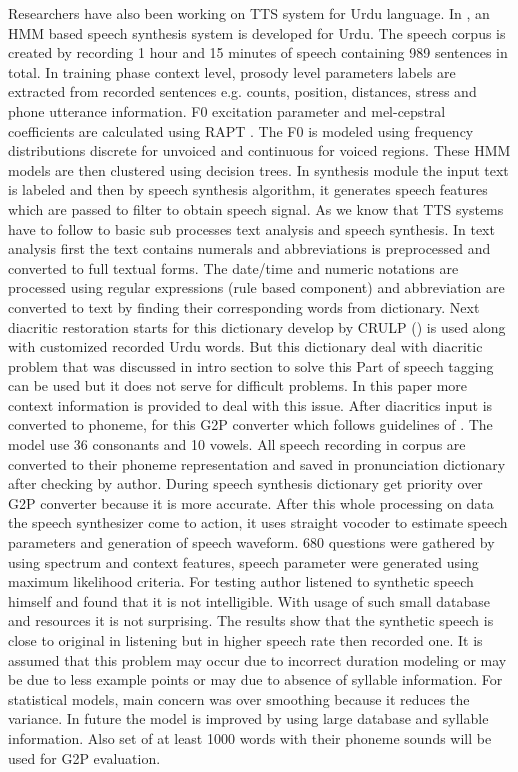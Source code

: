 Researchers have also been working on TTS system for Urdu language. In \cite{ahmed2014hmm}, an HMM based speech synthesis system is developed for Urdu. The speech corpus is created by recording 1 hour and 15 minutes of speech containing 989 sentences in total. In training phase context level, prosody level parameters labels are extracted from recorded sentences e.g. counts, position, distances, stress and phone utterance information. F0 excitation parameter and mel-cepstral coefficients are calculated using RAPT \cite{kleijn1995speech}. The F0 is modeled using frequency
distributions discrete for unvoiced and continuous for voiced regions. These HMM models are then clustered using decision
trees. In synthesis module the input text is labeled and then by speech synthesis algorithm, it generates speech features which
are passed to filter to obtain speech signal. As we know that TTS systems have to follow to basic sub processes text analysis
and speech synthesis. In text analysis first the text contains numerals and abbreviations is preprocessed and converted to full
textual forms. The date/time and numeric notations are processed using regular expressions (rule based component) and
abbreviation are converted to text by finding their corresponding words from dictionary. Next diacritic restoration starts for
this dictionary develop by CRULP (\cite{crulp}) is used along with customized recorded Urdu words. But this dictionary
deal with diacritic problem that was discussed in intro section to solve this Part of speech tagging can be used but it does not
serve for difficult problems. In this paper more context information is provided to deal with this issue. After diacritics input is
converted to phoneme, for this G2P converter which follows guidelines of \cite{hussain2004sound}. The model use 36
consonants and 10 vowels. All speech recording in corpus are converted to their phoneme representation and saved in
pronunciation dictionary after checking by author. During speech synthesis dictionary get priority over G2P converter
because it is more accurate. After this whole processing on data the speech synthesizer come to action, it uses straight
vocoder to estimate speech parameters and generation of speech waveform. 680 questions were gathered by using spectrum
and context features, speech parameter were generated using maximum likelihood criteria. For testing author listened to
synthetic speech himself and found that it is not intelligible. With usage of such small database and resources it is not
surprising. The results show that the synthetic speech is close to original in listening but in higher speech rate then recorded
one. It is assumed that this problem may occur due to incorrect duration modeling or may be due to less example points or
may due to absence of syllable information. For statistical models, main concern was over smoothing because it reduces the
variance. In future the model is improved by using large database and syllable information. Also set of at least 1000 words
with their phoneme sounds will be used for G2P evaluation.

